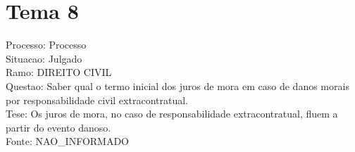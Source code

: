 \documentclass[12pt]{article}
\begin{document}
\section*{Tema 8}
Processo: Processo\\
Situacao: Julgado\\
Ramo: DIREITO CIVIL\\
Questao: Saber qual o termo inicial dos juros de mora em caso de danos morais por responsabilidade civil extracontratual.\\
Tese: Os juros de mora, no caso de responsabilidade extracontratual, fluem a partir do evento danoso.\\
Fonte: NAO\_INFORMADO
\end{document}
